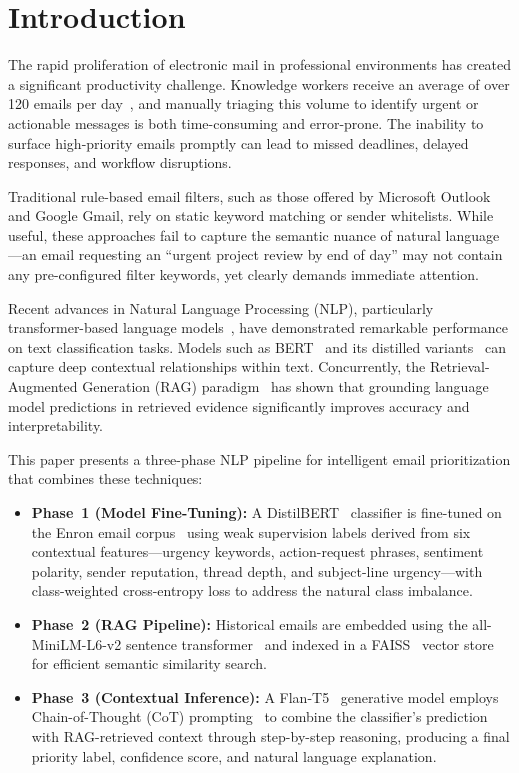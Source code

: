\documentclass[3p,times,procedia]{elsarticle}
\begin{document}
\vspace*{-6pt}

\section{Introduction}
\label{sec:intro}

The rapid proliferation of electronic mail in professional environments has created a significant productivity challenge. Knowledge workers receive an average of over 120 emails per day~\cite{radicati2023}, and manually triaging this volume to identify urgent or actionable messages is both time-consuming and error-prone. The inability to surface high-priority emails promptly can lead to missed deadlines, delayed responses, and workflow disruptions.

Traditional rule-based email filters, such as those offered by Microsoft Outlook and Google Gmail, rely on static keyword matching or sender whitelists. While useful, these approaches fail to capture the semantic nuance of natural language---an email requesting an ``urgent project review by end of day'' may not contain any pre-configured filter keywords, yet clearly demands immediate attention.

Recent advances in Natural Language Processing (NLP), particularly transformer-based language models~\cite{vaswani2017}, have demonstrated remarkable performance on text classification tasks. Models such as BERT~\cite{devlin2019} and its distilled variants~\cite{sanh2019} can capture deep contextual relationships within text. Concurrently, the Retrieval-Augmented Generation (RAG) paradigm~\cite{lewis2020} has shown that grounding language model predictions in retrieved evidence significantly improves accuracy and interpretability.

This paper presents a three-phase NLP pipeline for intelligent email prioritization that combines these techniques:

\begin{itemize}
\item \textbf{Phase~1 (Model Fine-Tuning):} A DistilBERT~\cite{sanh2019} classifier is fine-tuned on the Enron email corpus~\cite{klimt2004} using weak supervision labels derived from six contextual features---urgency keywords, action-request phrases, sentiment polarity, sender reputation, thread depth, and subject-line urgency---with class-weighted cross-entropy loss to address the natural class imbalance.
\item \textbf{Phase~2 (RAG Pipeline):} Historical emails are embedded using the all-MiniLM-L6-v2 sentence transformer~\cite{reimers2019} and indexed in a FAISS~\cite{johnson2019} vector store for efficient semantic similarity search.
\item \textbf{Phase~3 (Contextual Inference):} A Flan-T5~\cite{chung2022} generative model employs Chain-of-Thought (CoT) prompting~\cite{wei2022} to combine the classifier's prediction with RAG-retrieved context through step-by-step reasoning, producing a final priority label, confidence score, and natural language explanation.
\end{itemize}
\end{document}
